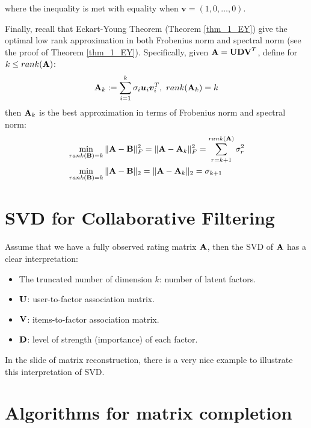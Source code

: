 \documentclass[../book-template.tex]{subfiles}
\begin{document}
where the inequality is met with equality when $\bm{v} = (1,0,\dots,0)$.
\par Finally, recall that Eckart-Young Theorem (Theorem \ref{thm_1_EY}) give the optimal low rank approximation in both Frobenius norm and spectral norm (see the proof of Theorem \ref{thm_1_EY}). Specifically, given ${\bf A}={\bf UDV}^T$, define for $k\leq rank({\bf A})$:
\begin{equation*}
	{\bf A}_k :=\sum_{i=1}^{k}\sigma_i \bm{u}_i\bm{v}_i^T,\ rank({\bf A}_k)=k
\end{equation*}
then ${\bf A}_k$ is the best approximation in terms of Frobenius norm and spectral norm:
\begin{align*}
	&\min_{rank({\bf B})=k}\|{\bf A}-{\bf B}\|^2_F=\|{\bf A}-{\bf A}_k\|_F^2=\sum_{r=k+1}^{rank({\bf A})} \sigma_r^2\\
	&\min_{rank({\bf B})=k}\|{\bf A}-{\bf B}\|_2=\|{\bf A}-{\bf A}_k\|_2=\sigma_{k+1}
\end{align*}
\section{SVD for Collaborative Filtering}
Assume that we have a fully observed rating matrix ${\bf A}$, then the SVD of ${\bf A}$ has a clear interpretation:
\begin{itemize}
	\item The truncated number of dimension $k$: number of latent factors.
	\item ${\bf U}$: user-to-factor association matrix.
	\item ${\bf V}$: items-to-factor association matrix.
	\item ${\bf D}$: level of strength (importance) of each factor.
\end{itemize} 
In the slide of matrix reconstruction, there is a very nice example to illustrate this interpretation of SVD.
\section{Algorithms for matrix completion}\label{sec_3_alg_for_mc}
\end{document}
